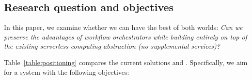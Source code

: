 

\subsection{Research question and objectives}
In this paper, we examine whether we can have the best of both worlds:
\emph{Can we preserve the advantages of workflow orchestrators while building
entirely on top of the existing serverless computing abstraction (no
supplemental services)?}

Table~\ref{table:positioning} compares the current solutions and \name{}.
Specifically, we aim for a system with the following objectives:

